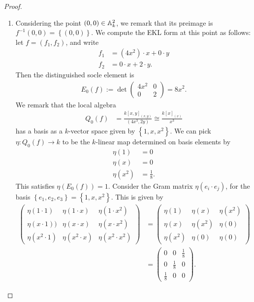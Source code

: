 \documentclass[english]{article}
\begin{document}
\begin{proof} $\ $
\begin{enumerate}
    \item Considering the point $(0,0) \in \mathbb{A}^2_k$, we remark that its preimage is $f^{-1}(0,0) = \left\{ (0,0) \right\}$. We compute the EKL form at this point as follows: let $f = (f_1,f_2)$, and write
    \begin{align*}
        f_1 &= (4x^2)\cdot x + 0\cdot y \\
        f_2 &= 0\cdot x + 2\cdot y.
    \end{align*}
    Then the distinguished socle element is
    \begin{align*}
        E_0(f) := \det \begin{pmatrix} 4x^2 & 0 \\ 0 & 2 \end{pmatrix} = 8x^2.
    \end{align*}
    We remark that the local algebra
    \begin{align*}
        Q_0(f) &= \frac{k[x,y]_{(x,y)}}{(4x^3, 2y)} \cong \frac{k[x]_{(x)}}{x^3}
    \end{align*}
    has a basis as a $k$-vector space given by $\left\{ 1,x,x^2 \right\}$. We can pick $\eta: Q_0(f) \to k$ to be the $k$-linear map determined on basis elements by
    \begin{align*}
        \eta(1) &= 0 \\
        \eta(x) &= 0 \\
        \eta(x^2) &= \frac{1}{8}.
    \end{align*}
    This satisfies $\eta(E_0(f)) = 1$. Consider the Gram matrix $\eta(e_i\cdot e_j)$, for the basis $\left\{ e_1,e_2,e_3 \right\} = \left\{ 1,x,x^2 \right\}$. This is given by
    \begin{align*}
        \begin{pmatrix} \eta(1\cdot 1) & \eta(1\cdot x) & \eta(1\cdot x^2) \\
        \eta(x\cdot 1)) & \eta(x\cdot x) & \eta(x\cdot x^2) \\
        \eta(x^2\cdot 1) & \eta(x^2 \cdot x) & \eta(x^2 \cdot x^2)\end{pmatrix} &= \begin{pmatrix} \eta(1) & \eta(x) & \eta(x^2) \\ \eta(x) & \eta(x^2) & \eta(0) \\
        \eta(x^2) & \eta(0) & \eta(0) \end{pmatrix} \\
        &= \begin{pmatrix} 0 & 0 & \frac{1}{8} \\ 0 & \frac{1}{8} & 0 \\ \frac{1}{8} & 0 & 0 \end{pmatrix}.

\end{align*}
\end{enumerate}
\end{proof}
\end{document}

